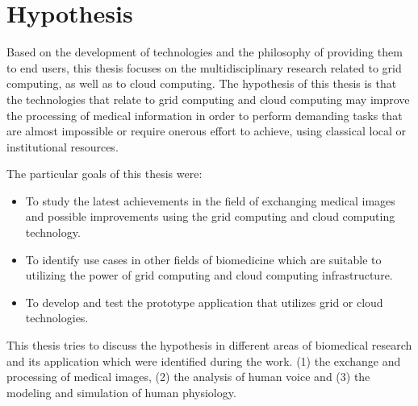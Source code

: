 \chapter{Hypothesis}

Based on the development of technologies and the philosophy of providing them to end users, this thesis focuses on the multidisciplinary research related to grid computing, as well as to cloud computing. The hypothesis of this thesis is that the technologies that relate to grid computing and cloud computing may improve the processing of medical information in order to perform demanding tasks that are almost impossible or require onerous effort to achieve, using classical local or institutional resources.

The particular goals of this thesis were:
\begin{itemize}
\item To study the latest achievements in the field of exchanging medical images and  possible improvements using the grid computing and cloud computing technology.
\item To identify use cases in other fields of biomedicine which are suitable to utilizing the power of grid computing and cloud computing infrastructure.
\item To develop and test the prototype application that utilizes grid or cloud technologies.
\end{itemize}

This thesis tries to discuss the hypothesis in different areas of biomedical research and its application which were identified during the work. (1) the exchange and processing of medical images, (2) the analysis of human voice and (3) the modeling and simulation of human physiology.

